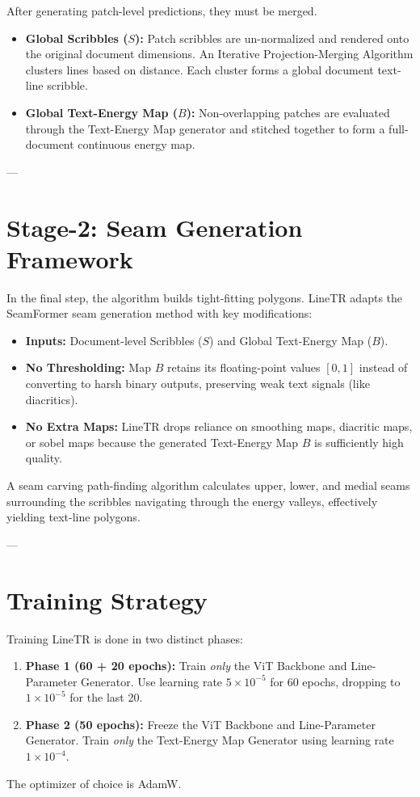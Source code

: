 \documentclass[12pt,a4paper]{article}
\begin{document}
After generating patch-level predictions, they must be merged.
\begin{itemize}
    \item \textbf{Global Scribbles ($S$):} Patch scribbles are un-normalized and rendered onto the original document dimensions. An Iterative Projection-Merging Algorithm clusters lines based on distance. Each cluster forms a global document text-line scribble.
    \item \textbf{Global Text-Energy Map ($B$):} Non-overlapping patches are evaluated through the Text-Energy Map generator and stitched together to form a full-document continuous energy map.
\end{itemize}

---

\section{Stage-2: Seam Generation Framework}

In the final step, the algorithm builds tight-fitting polygons. LineTR adapts the SeamFormer seam generation method with key modifications:
\begin{itemize}
    \item \textbf{Inputs:} Document-level Scribbles ($S$) and Global Text-Energy Map ($B$).
    \item \textbf{No Thresholding:} Map $B$ retains its floating-point values $[0, 1]$ instead of converting to harsh binary outputs, preserving weak text signals (like diacritics).
    \item \textbf{No Extra Maps:} LineTR drops reliance on smoothing maps, diacritic maps, or sobel maps because the generated Text-Energy Map $B$ is sufficiently high quality.
\end{itemize}
A seam carving path-finding algorithm calculates upper, lower, and medial seams surrounding the scribbles navigating through the energy valleys, effectively yielding text-line polygons.

---

\section{Training Strategy}

Training LineTR is done in two distinct phases:
\begin{enumerate}
    \item \textbf{Phase 1 (60 + 20 epochs):} Train \textit{only} the ViT Backbone and Line-Parameter Generator. Use learning rate $5 \times 10^{-5}$ for 60 epochs, dropping to $1 \times 10^{-5}$ for the last 20.
    \item \textbf{Phase 2 (50 epochs):} Freeze the ViT Backbone and Line-Parameter Generator. Train \textit{only} the Text-Energy Map Generator using learning rate $1 \times 10^{-4}$.
\end{enumerate}
The optimizer of choice is AdamW. 
\end{document}
